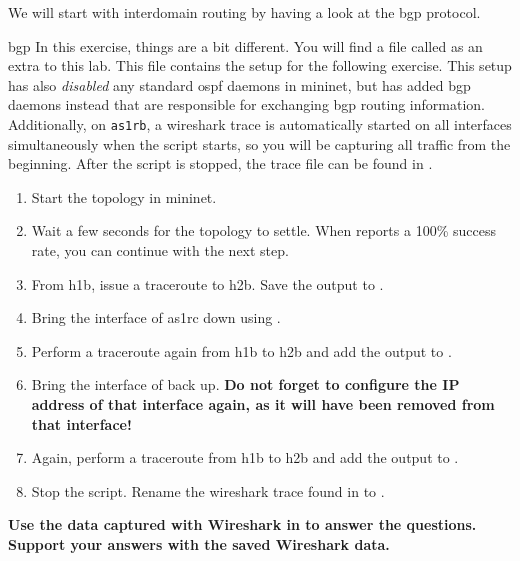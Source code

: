 We will start with interdomain routing by having a look at the \ac{bgp} protocol.

\begin{exercise}{\acs{bgp}}
	In this exercise, things are a bit different. You will find a file called  as an extra to this lab. This file contains the setup for the following exercise. This setup has also \emph{disabled} any standard \acs{ospf} daemons in mininet, but has added \acs{bgp} daemons instead that are responsible for exchanging \acs{bgp} routing information. Additionally, on \texttt{as1rb}, a wireshark trace is automatically started on all interfaces simultaneously when the script starts, so you will be capturing all traffic from the beginning. After the script is stopped, the trace file can be found in .


	\begin{enumerate}
		\item Start the  topology in mininet.
		\item Wait a few seconds for the topology to settle. When  reports a 100\% success rate, you can continue with the next step.
		\item From h1b, issue a traceroute to h2b. Save the output to .
		\item Bring the  interface of as1rc down using .
		\item Perform a traceroute again from h1b to h2b and add the output to .
		\item Bring the  interface of  back up. \textbf{Do not forget to configure the IP address of that interface again, as it will have been removed from that interface!}
		\item Again, perform a traceroute from h1b to h2b and add the output to .
		\item Stop the script. Rename the wireshark trace found in  to .
	\end{enumerate}

	\textbf{Use the data captured with Wireshark in  to answer the questions. Support your answers with the saved Wireshark data.}


\end{exercise}
